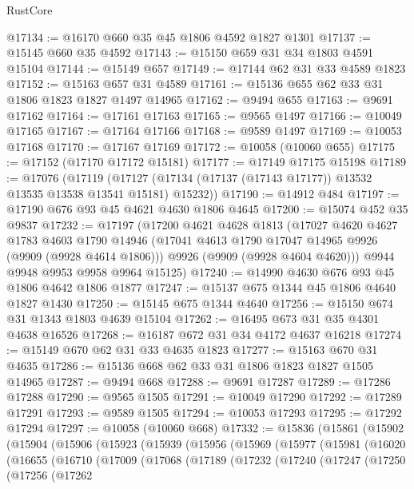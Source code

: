 \begin{lexlean}{RustCore}
\begin{coremodule}
@17134 := @16170 @660 @35 @45 @1806 @4592 @1827 @1301
@17137 := @15145 @660 @35 @4592
@17143 := @15150 @659 @31 @34 @1803 @4591 @15104
@17144 := @15149 @657
@17149 := @17144 @62 @31 @33 @4589 @1823
@17152 := @15163 @657 @31 @4589
@17161 := @15136 @655 @62 @33 @31 @1806 @1823 @1827 @1497 @14965
@17162 := @9494 @655
@17163 := @9691 @17162
@17164 := @17161 @17163
@17165 := @9565 @1497
@17166 := @10049 @17165
@17167 := @17164 @17166
@17168 := @9589 @1497
@17169 := @10053 @17168
@17170 := @17167 @17169
@17172 := @10058 (@10060 @655)
@17175 := @17152 (@17170 @17172 @15181)
@17177 := @17149 @17175 @15198
@17189 := @17076
    (@17119 (@17127 (@17134 (@17137 (@17143 @17177)) @13532 @13535 @13538 @13541 @15181) @15232))
@17190 := @14912 @484
@17197 := @17190 @676 @93 @45 @4621 @4630 @1806 @4645
@17200 := @15074 @452 @35 @9837
@17232 := @17197
    (@17200
      @4621
      @4628
      @1813
      (@17027
        @4620
        @4627
        @1783
        @4603
        @1790
        @14946
        (@17041 @4613 @1790 @17047 @14965 @9926 (@9909 (@9928 @4614 @1806)))
        @9926
        (@9909 (@9928 @4604 @4620)))
      @9944
      @9948
      @9953
      @9958
      @9964
      @15125)
@17240 := @14990 @4630 @676 @93 @45 @1806 @4642 @1806 @1877
@17247 := @15137 @675 @1344 @45 @1806 @4640 @1827 @1430
@17250 := @15145 @675 @1344 @4640
@17256 := @15150 @674 @31 @1343 @1803 @4639 @15104
@17262 := @16495 @673 @31 @35 @4301 @4638 @16526
@17268 := @16187 @672 @31 @34 @4172 @4637 @16218
@17274 := @15149 @670 @62 @31 @33 @4635 @1823
@17277 := @15163 @670 @31 @4635
@17286 := @15136 @668 @62 @33 @31 @1806 @1823 @1827 @1505 @14965
@17287 := @9494 @668
@17288 := @9691 @17287
@17289 := @17286 @17288
@17290 := @9565 @1505
@17291 := @10049 @17290
@17292 := @17289 @17291
@17293 := @9589 @1505
@17294 := @10053 @17293
@17295 := @17292 @17294
@17297 := @10058 (@10060 @668)
@17332 := @15836
    (@15861
      (@15902
        (@15904
          (@15906
            (@15923
              (@15939
                (@15956
                  (@15969
                    (@15977
                      (@15981
                        (@16020
                          (@16655
                            (@16710
                              (@17009
                                (@17068
                                  (@17189
                                    (@17232
                                      (@17240
                                        (@17247
                                          (@17250
                                            (@17256
                                              (@17262

\end{coremodule}
\end{lexlean}
